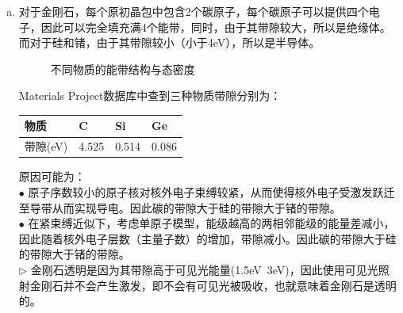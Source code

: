 \documentclass[reqno,a4paper,12pt]{amsart}
\begin{document}
\begin{enumerate}[1.]
\begin{tcolorbox}[breakable, colback = black!5!white, colframe = black]
\begin{enumerate}[(a)]
\item 对于金刚石，每个原初晶包中包含2个碳原子，每个碳原子可以提供四个电子，因此可以完全填充满4个能带，同时，由于其带隙较大，所以是绝缘体。而对于硅和锗，由于其带隙较小（小于4eV），所以是半导体。
\begin{figure}[H]
	\centering
	 \hspace{2pt}
	 \hspace{2pt}
	\caption{不同物质的能带结构与态密度}
\end{figure}
Materials Project数据库中查到三种物质带隙分别为：
\begin{table}[H]
\centering
\begin{tabular}{|l|l|l|l|}
\hline
物质 & C & Si & Ge \\ \hline
带隙(eV) & 4.525 & 0.514 & 0.086 \\ \hline
\end{tabular}
\end{table}
原因可能为： \\
$\bullet$ 原子序数较小的原子核对核外电子束缚较紧，从而使得核外电子受激发跃迁至导带从而实现导电。因此碳的带隙大于硅的带隙大于锗的带隙。 \\
$\bullet$ 在紧束缚近似下，考虑单原子模型，能级越高的两相邻能级的能量差减小，因此随着核外电子层数（主量子数）的增加，带隙减小。因此碳的带隙大于硅的带隙大于锗的带隙。 \\
$\triangleright$ 金刚石透明是因为其带隙高于可见光能量(1.5eV~3eV)，因此使用可见光照射金刚石并不会产生激发，即不会有可见光被吸收，也就意味着金刚石是透明的。
\end{enumerate}
\end{tcolorbox}


\end{enumerate}
\end{document}
